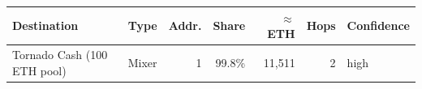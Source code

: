 \begin{tabular}{p{3.8cm} p{3.3cm} r r r r p{1.8cm}}\toprule
\textbf{Destination} & \textbf{Type} & \textbf{Addr.} & \textbf{Share} & \textbf{$\approx$ ETH} & \textbf{Hops} & \textbf{Confidence}\\\midrule
Tornado Cash (100 ETH pool) & Mixer & 1 & 99.8\% & 11,511 & 2 & high\\
\bottomrule\end{tabular}
